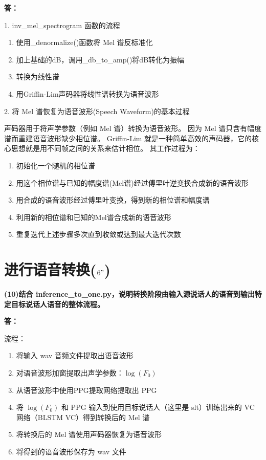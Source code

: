 \documentclass[degree=project,degree-type=project,cjk-font=noto]{thuthesis}
\begin{document}
\textbf{答：}

1. inv\_mel\_spectrogram 函数的流程

\begin{enumerate}
	\item 使用\_denormalize()函数将 Mel 谱反标准化
	\item 加上基础的dB，调用\_db\_to\_amp()将dB转化为振幅
	\item 转换为线性谱
	\item 用Griffin-Lim声码器将线性谱转换为语音波形
\end{enumerate}

2. 将 Mel 谱恢复为语音波形(Speech Waveform)的基本过程

声码器用于将声学参数（例如 Mel 谱）转换为语音波形。
因为 Mel 谱只含有幅度谱而重建语音波形缺少相位谱。
Griffin-Lim 就是一种简单高效的声码器，它的核心思想就是用不同帧之间的关系来估计相位。
其工作过程为：

\begin{enumerate}
	\item 初始化一个随机的相位谱
	\item 用这个相位谱与已知的幅度谱(Mel谱)经过傅里叶逆变换合成新的语音波形
	\item 用合成的语音波形经过傅里叶变换，得到新的相位谱和幅度谱
	\item 利用新的相位谱和已知的Mel谱合成新的语音波形
	\item 重复迭代上述步骤多次直到收敛或达到最大迭代次数
\end{enumerate}

\section{进行语音转换($6"$)}

\textbf{(10)结合 inference\_to\_one.py，说明转换阶段由输入源说话人的语音到输出特定目标说话人语音的整体流程。}

\textbf{答：}

流程：

\begin{enumerate}
	\item 将输入 wav 音频文件提取出语音波形
	\item 对语音波形加窗提取出声学参数：$\log(F_0)$
	\item 从语音波形中使用PPG提取网络提取出 PPG
	\item 将 $\log(F_0)$ 和 PPG 输入到使用目标说话人（这里是 slt）训练出来的 VC 网络（BLSTM VC）得到转换后的 Mel 谱
	\item 将转换后的 Mel 谱使用声码器恢复为语音波形
	\item 将得到的语音波形保存为 wav 文件
\end{enumerate}
\end{document}
